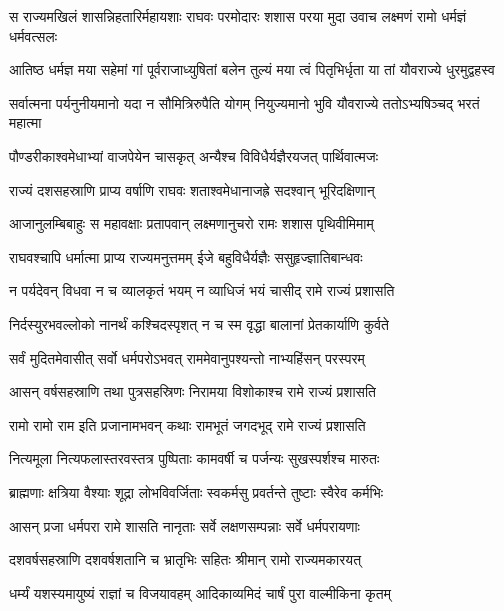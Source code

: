 \threelineshloka
{स राज्यमखिलं शासन्निहतारिर्महायशाः}
{राघवः परमोदारः शशास परया मुदा}
{उवाच लक्ष्मणं रामो धर्मज्ञं धर्मवत्सलः} %

\twolineshloka
{आतिष्ठ धर्मज्ञ मया सहेमां गां पूर्वराजाध्युषितां बलेन}
{तुल्यं मया त्वं पितृभिर्धृता या तां यौवराज्ये धुरमुद्वहस्व} %

\twolineshloka
{सर्वात्मना पर्यनुनीयमानो यदा न सौमित्रिरुपैति योगम्}
{नियुज्यमानो भुवि यौवराज्ये ततोऽभ्यषिञ्चद् भरतं महात्मा} %

\twolineshloka
{पौण्डरीकाश्वमेधाभ्यां वाजपेयेन चासकृत्}
{अन्यैश्च विविधैर्यज्ञैरयजत् पार्थिवात्मजः} %

\twolineshloka
{राज्यं दशसहस्राणि प्राप्य वर्षाणि राघवः}
{शताश्वमेधानाजह्रे सदश्वान् भूरिदक्षिणान्} %

\twolineshloka
{आजानुलम्बिबाहुः स महावक्षाः प्रतापवान्}
{लक्ष्मणानुचरो रामः शशास पृथिवीमिमाम्} %

\twolineshloka
{राघवश्चापि धर्मात्मा प्राप्य राज्यमनुत्तमम्}
{ईजे बहुविधैर्यज्ञैः ससुहृज्ज्ञातिबान्धवः} %

\twolineshloka
{न पर्यदेवन् विधवा न च व्यालकृतं भयम्}
{न व्याधिजं भयं चासीद् रामे राज्यं प्रशासति} %

\twolineshloka
{निर्दस्युरभवल्लोको नानर्थं कश्चिदस्पृशत्}
{न च स्म वृद्धा बालानां प्रेतकार्याणि कुर्वते} %

\twolineshloka
{सर्वं मुदितमेवासीत् सर्वो धर्मपरोऽभवत्}
{राममेवानुपश्यन्तो नाभ्यहिंसन् परस्परम्} %

\twolineshloka
{आसन् वर्षसहस्राणि तथा पुत्रसहस्रिणः}
{निरामया विशोकाश्च रामे राज्यं प्रशासति} %

\twolineshloka
{रामो रामो राम इति प्रजानामभवन् कथाः}
{रामभूतं जगदभूद् रामे राज्यं प्रशासति} %

\twolineshloka
{नित्यमूला नित्यफलास्तरवस्तत्र पुष्पिताः}
{कामवर्षी च पर्जन्यः सुखस्पर्शश्च मारुतः} %

\twolineshloka
{ब्राह्मणाः क्षत्रिया वैश्याः शूद्रा लोभविवर्जिताः}
{स्वकर्मसु प्रवर्तन्ते तुष्टाः स्वैरेव कर्मभिः} %

\twolineshloka
{आसन् प्रजा धर्मपरा रामे शासति नानृताः}
{सर्वे लक्षणसम्पन्नाः सर्वे धर्मपरायणाः} %

\twolineshloka
{दशवर्षसहस्राणि दशवर्षशतानि च}
{भ्रातृभिः सहितः श्रीमान् रामो राज्यमकारयत्} %

\twolineshloka
{धर्म्यं यशस्यमायुष्यं राज्ञां च विजयावहम्}
{आदिकाव्यमिदं चार्षं पुरा वाल्मीकिना कृतम्} %

